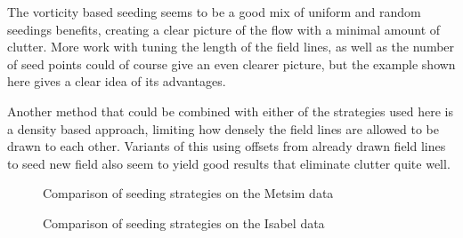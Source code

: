 \documentclass{article}
\begin{document}
The vorticity based seeding seems to be a good mix of uniform and random seedings
benefits, creating a clear picture of the flow with a minimal amount of clutter.
More work with tuning the length of the field lines, as well as the number of
seed points could of course give an even clearer picture, but the example shown here
gives a clear idea of its advantages.

Another method that could be combined with either of the strategies used here is
a density based approach, limiting how densely the field lines are allowed to be
drawn to each other. Variants of this using offsets from already drawn field lines
to seed new field also seem to yield good results that eliminate clutter quite well.

\begin{figure}
\caption{Comparison of seeding strategies on the Metsim data}
\end{figure}

\begin{figure}
\caption{Comparison of seeding strategies on the Isabel data}
\end{figure}
\end{document}
